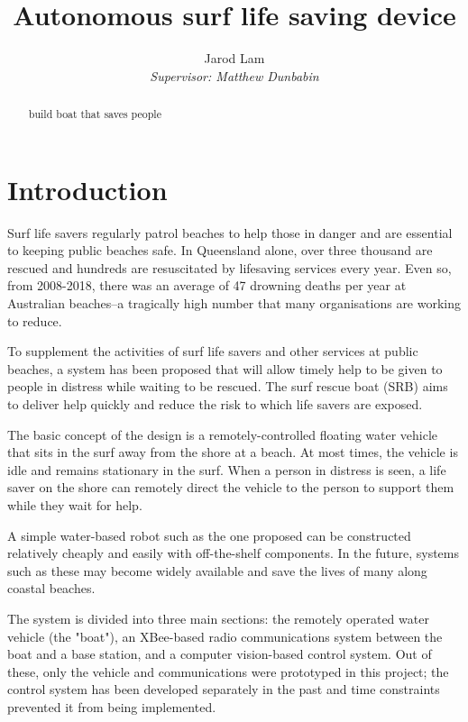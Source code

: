 \documentclass[a4paper]{IEEEtran}
\title{\vspace{5.0cm}Autonomous surf life saving device}
\author{\Large Jarod Lam\\ \textit{Supervisor: Matthew Dunbabin}}
\begin{document}
\begin{minipage}{\textwidth}
\vfill
\maketitle
\vfill
\end{minipage}
\clearpage

\begin{abstract}
build boat that saves people
\end{abstract}

\tableofcontents

\section{Introduction}
Surf life savers regularly patrol beaches to help those in danger and are essential to keeping public beaches safe. In Queensland alone, over three thousand are rescued and hundreds are resuscitated by lifesaving services every year. \cite{lifesaving} Even so, from 2008-2018, there was an average of 47 drowning deaths per year at Australian beaches--a tragically high number that many organisations are working to reduce. \cite{drowning}

To supplement the activities of surf life savers and other services at public beaches, a system has been proposed that will allow timely help to be given to people in distress while waiting to be rescued. The surf rescue boat (SRB) aims to deliver help quickly and reduce the risk to which life savers are exposed.

The basic concept of the design is a remotely-controlled floating water vehicle that sits in the surf away from the shore at a beach. At most times, the vehicle is idle and remains stationary in the surf. When a person in distress is seen, a life saver on the shore can remotely direct the vehicle to the person to support them while they wait for help.

A simple water-based robot such as the one proposed can be constructed relatively cheaply and easily with off-the-shelf components. In the future, systems such as these may become widely available and save the lives of many along coastal beaches.

The system is divided into three main sections: the remotely operated water vehicle (the "boat"), an XBee-based radio communications system between the boat and a base station, and a computer vision-based control system. Out of these, only the vehicle and communications were prototyped in this project; the control system has been developed separately in the past and time constraints prevented it from being implemented.
\end{document}
